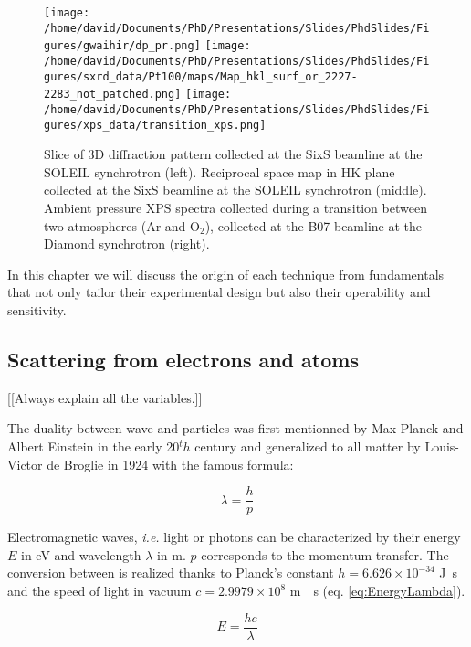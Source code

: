 \begin{figure}[!htb]
    \centering
    \texttt{[image: /home/david/Documents/PhD/Presentations/Slides/PhdSlides/Figures/gwaihir/dp\_pr.png]}
    \texttt{[image: /home/david/Documents/PhD/Presentations/Slides/PhdSlides/Figures/sxrd\_data/Pt100/maps/Map\_hkl\_surf\_or\_2227-2283\_not\_patched.png]}
    \texttt{[image: /home/david/Documents/PhD/Presentations/Slides/PhdSlides/Figures/xps\_data/transition\_xps.png]}
    \caption{Slice of 3D diffraction pattern collected at the SixS beamline at the SOLEIL synchrotron (left). Reciprocal space map in HK plane collected at the SixS beamline at the SOLEIL synchrotron (middle). Ambient pressure XPS spectra collected during a transition between two atmospheres {\color{DarkOrange}(Ar and O$_2$)}, collected at the B07 beamline at the Diamond synchrotron (right).}
\end{figure}


In this chapter we will discuss the origin of each technique from fundamentals that not only tailor their experimental design but also their operability and sensitivity.

\subsection{Scattering from electrons and atoms}

{\color{DarkOrange}[[Always explain all the variables.]]}

The duality between wave and particles was first mentionned by Max Planck and Albert Einstein in the early 20${^th}$ century and generalized to all matter by Louis-Victor de Broglie in 1924 with the famous formula:

\begin{equation}
	\lambda = \frac{h}{p}
\end{equation}

Electromagnetic waves, \textit{i.e.} light or photons can be characterized by their energy $E$ in \si{\electronvolt} and wavelength $\lambda$ in \si{\meter}. {\color{DarkOrange}$p$ corresponds to the momentum transfer.}
The conversion between is realized thanks to Planck's constant $h = 6.626 \times 10^{-34}$ \si{\joule.\second} and the speed of light in vacuum $c = 2.9979 \times 10^{8}$ \si{\meter.\per \second} (eq. \ref{eq:EnergyLambda}).

\begin{equation}
    \label{eq:EnergyLambda}
	E = \frac{hc}{\lambda}
\end{equation}

